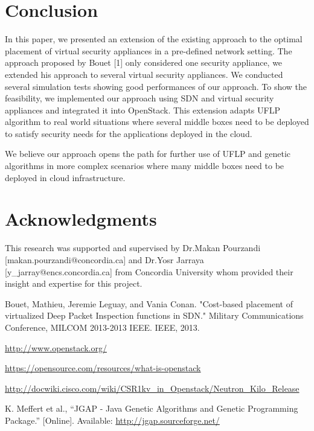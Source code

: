 \documentclass{article}
\begin{document}
\section{Conclusion}
In this paper, we presented an extension of the existing approach to the optimal placement of virtual security appliances in a pre-defined network setting. The approach proposed by Bouet [1] only considered one security appliance, we extended his approach to several virtual security appliances. We conducted several simulation tests showing good performances of our approach. To show the feasibility, we implemented our approach using SDN and virtual security appliances and integrated it into OpenStack. This extension adapts UFLP algorithm to real world situations where several middle boxes need to be deployed to satisfy security needs for the applications deployed in the cloud.

We believe our approach opens the path for further use of UFLP and genetic algorithms in more complex scenarios where many middle boxes need to be deployed in cloud infrastructure.

\section{Acknowledgments}
This research was supported and supervised by Dr.Makan Pourzandi [makan.pourzandi@concordia.ca] and Dr.Yosr Jarraya [y\_jarray@encs.concordia.ca] from Concordia University whom provided their insight and expertise for this project.



\newpage

\item  Bouet, Mathieu, Jeremie Leguay, and Vania Conan. "Cost-based placement of virtualized Deep Packet Inspection
functions in SDN." Military Communications Conference, MILCOM 2013-2013 IEEE. IEEE, 2013.
\item  \url{http://www.openstack.org/}
\item  \url{https://opensource.com/resources/what-is-openstack}
\item  \url{http://docwiki.cisco.com/wiki/CSR1kv_in_Openstack/Neutron_Kilo_Release}
\item  K. Meffert et al., “JGAP - Java Genetic Algorithms and Genetic Programming Package.” [Online]. Available: \url{http://jgap.sourceforge.net/}

\end{document}
